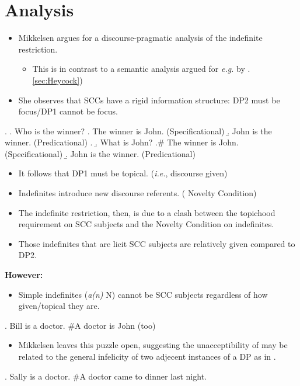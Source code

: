 \documentclass[letterpaper]{article}
\begin{document}
\section{ Analysis}
\begin{itemize}
  \item Mikkelsen argues for a discourse-pragmatic analysis of the indefinite restriction.
    \begin{itemize}
      \item This is in contrast to a semantic analysis argued for \textit{e.g.} by \textcite{heycock2012specification}. \ref{sec:Heycock}) 
    \end{itemize}
  \item She observes that SCCs have a rigid information structure: DP2 must be focus/DP1 cannot be focus.
\end{itemize}
\ex.\label{ex:SCCIS} 
\a. Who is the winner?
\a. The winner is John. \hfill (Specificational)
\b. John is the winner. \hfill (Predicational)
\z.
\b. What is John?
\a.\# The winner is John. \hfill (Specificational)
\b. John is the winner. \hfill (Predicational)

\begin{itemize}
  \item It follows that DP1 must be topical. (\textit{i.e.}, discourse given)
  \item Indefinites introduce new discourse referents. ( Novelty Condition)
  \item The indefinite restriction, then, is due to a clash between the topichood requirement on SCC subjects and the Novelty Condition on indefinites.
  \item Those indefinites that are licit SCC subjects are relatively given compared to DP2.
\end{itemize}
\textbf{However:}
\begin{itemize}
  \item Simple indefinites (\textit{a(n)} N) cannot be SCC subjects regardless of how given/topical they are.
\end{itemize}
\ex. Bill is a doctor. \#A doctor is John (too) \parencite[][p236]{mikkelsen2004specifying}

\begin{itemize}
  \item Mikkelsen leaves this puzzle open, suggesting the unacceptibility of \Last may be related to the general infelicity of two adjecent instances of a DP as in \Next.
\end{itemize}
\ex. Sally is a doctor. \#A doctor came to dinner last night. \parencite[][p236]{mikkelsen2004specifying}
\end{document}
